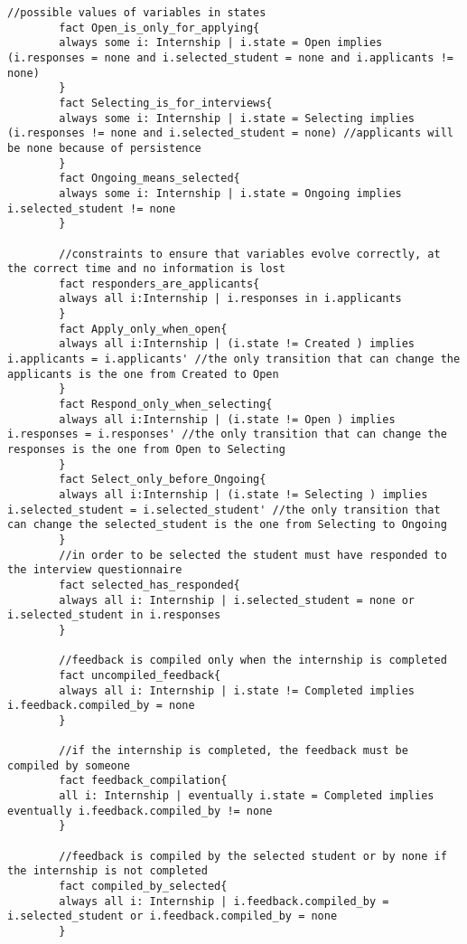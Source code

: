 \begin{lstlisting}[language=Alloy]
        //possible values of variables in states
        fact Open_is_only_for_applying{
        always some i: Internship | i.state = Open implies (i.responses = none and i.selected_student = none and i.applicants != none)
        }
        fact Selecting_is_for_interviews{
        always some i: Internship | i.state = Selecting implies (i.responses != none and i.selected_student = none) //applicants will be none because of persistence
        }
        fact Ongoing_means_selected{
        always some i: Internship | i.state = Ongoing implies i.selected_student != none
        }
        
        //constraints to ensure that variables evolve correctly, at the correct time and no information is lost
        fact responders_are_applicants{
        always all i:Internship | i.responses in i.applicants
        }
        fact Apply_only_when_open{
        always all i:Internship | (i.state != Created ) implies i.applicants = i.applicants' //the only transition that can change the applicants is the one from Created to Open
        }
        fact Respond_only_when_selecting{
        always all i:Internship | (i.state != Open ) implies i.responses = i.responses' //the only transition that can change the responses is the one from Open to Selecting
        }
        fact Select_only_before_Ongoing{
        always all i:Internship | (i.state != Selecting ) implies i.selected_student = i.selected_student' //the only transition that can change the selected_student is the one from Selecting to Ongoing
        }
        //in order to be selected the student must have responded to the interview questionnaire
        fact selected_has_responded{
        always all i: Internship | i.selected_student = none or i.selected_student in i.responses
        }
        
        //feedback is compiled only when the internship is completed
        fact uncompiled_feedback{
        always all i: Internship | i.state != Completed implies i.feedback.compiled_by = none
        }
        
        //if the internship is completed, the feedback must be compiled by someone
        fact feedback_compilation{
        all i: Internship | eventually i.state = Completed implies eventually i.feedback.compiled_by != none
        }
        
        //feedback is compiled by the selected student or by none if the internship is not completed
        fact compiled_by_selected{
        always all i: Internship | i.feedback.compiled_by = i.selected_student or i.feedback.compiled_by = none
        }
        

\end{lstlisting}
